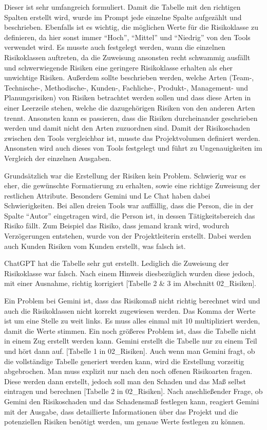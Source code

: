 Dieser ist sehr umfangreich formuliert. Damit die Tabelle mit den richtigen Spalten erstellt wird, wurde im Prompt jede
einzelne Spalte aufgezählt und beschrieben. Ebenfalls ist es wichtig, die möglichen Werte für die Risikoklasse zu 
definieren, da hier sonst immer ``Hoch'', ``Mittel'' und ``Niedrig'' von den Tools verwendet wird. Es musste auch 
festgelegt werden, wann die einzelnen Risikoklassen auftreten, da die Zuweisung ansonsten recht schwammig ausfällt und
schwerwiegende Risiken eine geringere Risikoklasse erhalten als eher unwichtige Risiken. Außerdem sollte beschrieben 
werden, welche Arten (Team-, Technische-, Methodische-, Kunden-, Fachliche-, Produkt-, Management- und Planungsrisiken) 
von Risiken betrachtet werden sollen und dass diese Arten in einer Leerzeile stehen, welche die dazugehörigen Risiken von 
den anderen Arten trennt. Ansonsten kann es passieren, dass die Risiken durcheinander geschrieben werden und damit nicht 
den Arten zuzuordnen sind. Damit der Risikoschaden zwischen den Tools vergleichbar ist, musste das Projektvolumen definiert 
werden. Ansonsten wird auch dieses von Tools festgelegt und führt zu Ungenauigkeiten im Vergleich der einzelnen Ausgaben.

Grundsätzlich war die Erstellung der Risiken kein Problem. Schwierig war es eher, die gewünschte Formatierung zu erhalten, 
sowie eine richtige Zuweisung der restlichen Attribute. Besonders Gemini und Le Chat haben dabei Schwierigkeiten.
Bei allen dreien Tools war auffällig, dass die Person, die in der Spalte ``Autor'' eingetragen wird, die Person ist, in dessen
Tätigkeitsbereich das Risiko fällt. Zum Beispiel das Risiko, dass jemand krank wird, wodurch Verzögerungen entstehen, wurde von 
der Projektleiterin erstellt. Dabei werden auch Kunden Risiken vom Kunden erstellt, was falsch ist.

ChatGPT hat die Tabelle sehr gut erstellt. Lediglich die Zuweisung der Risikoklasse war falsch. Nach einem Hinweis 
diesbezüglich wurden diese jedoch, mit einer Ausnahme, richtig korrigiert [Tabelle 2 \& 3 im Abschnitt 02\_Risiken].

Ein Problem bei Gemini ist, dass das Risikomaß nicht richtig berechnet wird und auch die Risikoklassen nicht korrekt 
zugewiesen werden. Das Komma der Werte ist um eine Stelle zu weit links. Es muss alles einmal mit 10 multipliziert werden, damit die 
Werte stimmen. Ein noch größeres Problem ist, dass die Tabelle nicht in einem Zug erstellt werden kann. Gemini erstellt die Tabelle nur zu einem 
Teil und hört dann auf. [Tabelle 1 in 02\_Risiken]. Auch wenn man Gemini fragt, ob die vollständige Tabelle generiert werden kann, wird 
die Erstellung vorzeitig abgebrochen. Man muss explizit nur nach den noch offenen Risikoarten fragen. Diese werden dann erstellt, jedoch soll man 
den Schaden und das Maß selbst eintragen und berechnen [Tabelle 2 in 02\_Risiken]. Nach anschließender Frage, ob Gemini den Risikoschaden und das Schadensmaß 
festlegen kann, reagiert Gemini mit der Ausgabe, dass detaillierte Informationen über das Projekt und die potenziellen Risiken benötigt werden, 
um genaue Werte festlegen zu können.

